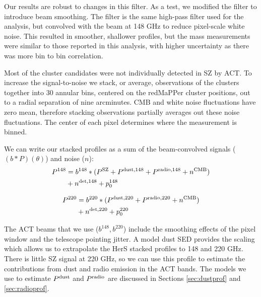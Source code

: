 \documentclass[a4paper,fleqn,usenatbib]{mnras}
\begin{document}
Our results are robust to changes in this filter.  As a test, we modified the filter to introduce beam smoothing.  The filter is the same high-pass filter used for the analysis, but convolved with the beam at 148 GHz to reduce pixel-scale white noise. 
This resulted in smoother, shallower profiles, but the mass measurements were similar to those reported in this analysis, with higher uncertainty as there was more bin to bin correlation.

Most of the cluster candidates were not individually detected in SZ by ACT. 
To increase the signal-to-noise we stack, or average, observations of the clusters together into 30 annular bins, centered on the redMaPPer cluster positions, out to a radial separation of nine arcminutes. 
CMB and white noise fluctuations have zero mean, therefore stacking observations partially averages out these noise fluctuations. 
The center of each pixel determines where the measurement is binned.

We can write our stacked profiles as a sum of the beam-convolved signals ($(b \ast P)(\theta)$) and noise ($n$):
\begin{equation}
\begin{split}
      P^{148} & = b^{148} \ast ( P^{\rm SZ} + P^{\rm dust,148} + P^{\rm radio,148} + n^{\rm CMB} ) \\ & + n^{\rm det,148} + p_0^{148}
\end{split}
\label{eq:prof148}
\end{equation}

\begin{equation}
  \label{eq:prof220}
 \begin{split}
  P^{220} & = b^{220} \ast ( P^{\rm dust,220} + P^{\rm radio,220} + n^{\rm CMB} ) \\ & + n^{\rm det,220} + p_0^{220}
\end{split}
\end{equation}

The ACT beams that we use ($b^{148}, b^{220}$) include the smoothing effects of the pixel window and the telescope pointing jitter.
A model dust SED provides the scaling which allows us to extrapolate the HerS stacked profiles to 148 and 220 GHz.
There is little SZ signal at 220 GHz, so we can use this profile to estimate the contributions from dust and radio emission in the ACT bands. 
The models we use to estimate $P^{\rm dust}$ and $P^{\rm radio}$ are discussed in Sections \ref{sec:dustprof} and \ref{sec:radioprof}.
\end{document}

